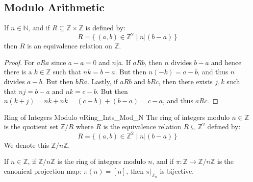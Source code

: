 \documentclass{article}                                                        %
\begin{document}
        \subsection{Modulo Arithmetic}
            \begin{theorem}
                \label{thm:Modulo_n_is_Equiv_Relation}%
                If $n\in\mathbb{N}$, and if
                $R\subseteq\mathbb{Z}\times\mathbb{Z}$ is defined by:
                \begin{equation}
                    R=\{\,(a,b)\in\mathbb{Z}^{2}\;|\;n|(b-a)\,\}
                \end{equation}
                then $R$ is an equivalence relation on $\mathbb{Z}$.
            \end{theorem}
            \begin{proof}
                For $aRa$ since $a-a=0$ and $n|a$. If $aRb$, then $n$ divides
                $b-a$ and hence there is a $k\in\mathbb{Z}$ such that
                $nk=b-a$. But then $n(\minus{k})=a-b$, and thus $n$ divides $a-b$.
                But then $bRa$. Lastly, if $aRb$ and $bRc$, then there exists
                $j,k$ such that $nj=b-a$ and $nk=c-b$. But then
                $n(k+j)=nk+nk=(c-b)+(b-a)=c-a$, and thus $aRc$.
            \end{proof}
            \begin{fdefinition}{Ring of Integers Modulo $n$}{Ring_Ints_Mod_N}
                The ring of integers modulo $n\in\mathbb{Z}$ is the quotient set
                $\mathbb{Z}/R$ where $R$ is the equivalence relation
                $R\subseteq\mathbb{Z}^{2}$ defined by:
                \begin{equation*}
                    R=\{\,(a,b)\in\mathbb{Z}^{2}\;|\;n|(b-a)\,\}
                \end{equation*}
                We denote this $\mathbb{Z}/n\mathbb{Z}$.
            \end{fdefinition}
            \begin{theorem}
                \label{thm:Z_n_is_Bij_onto_Z_mod_n}%
                If $n\in\mathbb{Z}$, if $\mathbb{Z}/n\mathbb{Z}$ is the ring of
                integers modulo $n$, and if
                $\pi:\mathbb{Z}\rightarrow\mathbb{Z}/n\mathbb{Z}$ is the canonical
                projection map: $\pi(n)=[n]$, then $\pi|_{\mathbb{Z}_{n}}$ is
                bijective.
            \end{theorem}
\end{document}
